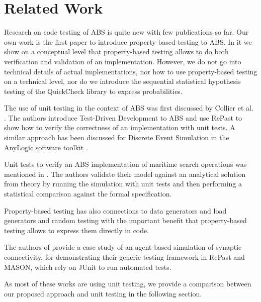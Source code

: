 \section{Related Work}
\label{sec:related}
Research on code testing of ABS is quite new with few publications so far. Our own work \cite{thaler_show_2019} is the first paper to introduce property-based testing to ABS. In it we show on a conceptual level that property-based testing allows to do both verification and validation of an implementation. However, we do not go into technical details of actual implementations, nor how to use property-based testing on a technical level, nor do we introduce the sequential statistical hypothesis testing of the QuickCheck library to express probabilities. 

The use of unit testing in the context of ABS was first discussed by Collier et al. \cite{collier_test-driven_2013}. The authors introduce Test-Driven Development to ABS and use RePast to show how to verify the correctness of an implementation with unit tests. A similar approach has been discussed for Discrete Event Simulation in the AnyLogic software toolkit \cite{asta_investigation_2014}. 

Unit tests to verify an ABS implementation of maritime search operations was mentioned in \cite{onggo_test-driven_2016}. The authors validate their model against an analytical solution from theory by running the simulation with unit tests and then performing a statistical comparison against the formal specification.

Property-based testing has also connections to data generators \cite{gurcan_generic_2013} and load generators and random testing \cite{burnstein_practical_2010} with the important benefit that property-based testing allows to express them directly in code.

The authors of \cite{gurcan_generic_2013} provide a case study of an agent-based simulation of synaptic connectivity, for demonstrating their generic testing framework in RePast and MASON, which rely on JUnit to run automated tests.

As most of these works are using unit testing, we provide a comparison between our proposed approach and unit testing in the following section.